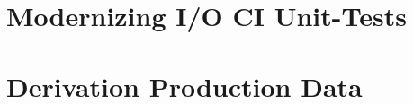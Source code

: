 \documentclass[12pt]{niuthesis}
\begin{document}
\chapter{Modernizing I/O CI Unit-Tests}


\printbibliography

\clearpage
\appendix

% 

\chapter{Derivation Production Data}

\end{document}
